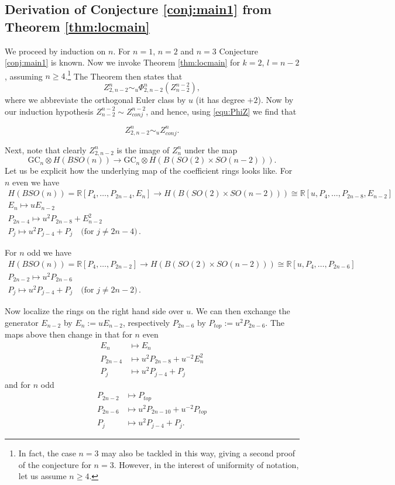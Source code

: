 \documentclass[a4paper]{amsart}
\theoremstyle{plain}
\theoremstyle{definition}
\newcommand{\R}{{\mathbb{R}}}
\newcommand{\GC}{\mathrm{GC}}
\newcommand{\SO}{\mathit{SO}}
\newcommand{\beq}[1]{
\begin{equation}\label{#1}
}
\newcommand{\eeq}{
\end{equation}
}
\begin{document}
\subsection{Derivation of Conjecture \ref{conj:main1} from Theorem \ref{thm:locmain}}
We proceed by induction on $n$. For $n=1$, $n=2$ and $n=3$ Conjecture \ref{conj:main1} is known.
Now we invoke Theorem \ref{thm:locmain} for $k=2$, $l=n-2$, assuming $n\geq 4$.\footnote{In fact, the case $n=3$ may also be tackled in this way, giving a second proof of the conjecture for $n=3$. However, in the interest of uniformity of notation, let us assume $n\geq 4$.}
The Theorem then states that
\[
 Z_{2,n-2}^n \sim_{u} \Phi_{2,n-2}^n (Z_{n-2}^{n-2}),
\] 
where we abbreviate the orthogonal Euler class by $u$ (it has degree $+2$).
Now by our induction hypothesis $Z_{n-2}^{n-2}\sim Z_{conj}^{n-2}$, and hence, using \eqref{equ:PhiZ} we find that
\beq{equ:tmp11}
Z_{2,n-2}^n \sim_{u}  Z_{conj}^n.
\eeq
Next, note that clearly $Z_{2,n-2}^n$ is the image of $Z_n^n$ under the map 
\[
\GC_n\otimes H(B\SO(n)) \to \GC_n\otimes H(B(\SO(2)\times \SO(n-2))).
\]
Let us be explicit how the underlying map of the coefficient rings looks like.
For $n$ even we have
\begin{gather*}
H(B\SO(n)) = \R[P_4,\dots,P_{2n-4}, E_n] \to H(B(\SO(2)\times \SO(n-2))) \cong \R[u, P_4,\dots,P_{2n-8},E_{n-2}]
\\
E_n \mapsto u E_{n-2} \\
P_{2n-4}\mapsto u^2 P_{2n-8}+ E_{n-2}^2 \\
P_j\mapsto u^2 P_{j-4} + P_j \quad \text{(for $j\neq 2n-4$)}\, .
\end{gather*}

For $n$ odd we have
\begin{gather*}
H(B\SO(n)) = \R[P_4,\dots,P_{2n-2}] \to H(B(\SO(2)\times \SO(n-2))) \cong \R[u, P_4,\dots,P_{2n-6}]
\\
P_{2n-2}\mapsto u^2 P_{2n-6} \\
P_j\mapsto u^2 P_{j-4} + P_j \quad \text{(for $j\neq 2n-2$)} \, .
\end{gather*}

Now localize the rings on the right hand side over $u$. We can then exchange the generator $E_{n-2}$ by $E_n:=uE_{n-2}$, respectively $P_{2n-6}$ by $P_{top} := u^2P_{2n-6}$.
The maps above then change in that for $n$ even
\begin{align*}
E_n&\mapsto E_n \\ 
P_{2n-4}&\mapsto u^2 P_{2n-8}+ u^{-2} E_{n}^2 \\
P_j&\mapsto u^2 P_{j-4} + P_j 
\end{align*}
and for $n$ odd
\begin{align*}
P_{2n-2} &\mapsto P_{top} \\  
P_{2n-6}&\mapsto u^2 P_{2n-10}+u^{-2} P_{top} \\
P_j&\mapsto u^2 P_{j-4} + P_j . 
\end{align*}
\end{document}
